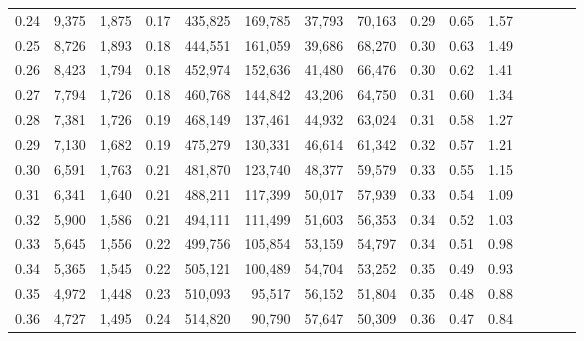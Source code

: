 \begin{tabular}{rrrcrrrrrrrrrrr}
0.24 &   9,375 &  1,875 &                                       0.17 &  435,825 &  169,785 &   37,793 &   70,163 &  0.29 &  0.65 &                         1.57 \\
0.25 &   8,726 &  1,893 &                                       0.18 &  444,551 &  161,059 &   39,686 &   68,270 &  0.30 &  0.63 &                         1.49 \\
0.26 &   8,423 &  1,794 &                                       0.18 &  452,974 &  152,636 &   41,480 &   66,476 &  0.30 &  0.62 &                         1.41 \\
0.27 &   7,794 &  1,726 &                                       0.18 &  460,768 &  144,842 &   43,206 &   64,750 &  0.31 &  0.60 &                         1.34 \\
0.28 &   7,381 &  1,726 &                                       0.19 &  468,149 &  137,461 &   44,932 &   63,024 &  0.31 &  0.58 &                         1.27 \\
0.29 &   7,130 &  1,682 &                                       0.19 &  475,279 &  130,331 &   46,614 &   61,342 &  0.32 &  0.57 &                         1.21 \\
0.30 &   6,591 &  1,763 &                                       0.21 &  481,870 &  123,740 &   48,377 &   59,579 &  0.33 &  0.55 &                         1.15 \\
0.31 &   6,341 &  1,640 &                                       0.21 &  488,211 &  117,399 &   50,017 &   57,939 &  0.33 &  0.54 &                         1.09 \\
0.32 &   5,900 &  1,586 &                                       0.21 &  494,111 &  111,499 &   51,603 &   56,353 &  0.34 &  0.52 &                         1.03 \\
0.33 &   5,645 &  1,556 &                                       0.22 &  499,756 &  105,854 &   53,159 &   54,797 &  0.34 &  0.51 &                         0.98 \\
0.34 &   5,365 &  1,545 &                                       0.22 &  505,121 &  100,489 &   54,704 &   53,252 &  0.35 &  0.49 &                         0.93 \\
0.35 &   4,972 &  1,448 &                                       0.23 &  510,093 &   95,517 &   56,152 &   51,804 &  0.35 &  0.48 &                         0.88 \\
0.36 &   4,727 &  1,495 &                                       0.24 &  514,820 &   90,790 &   57,647 &   50,309 &  0.36 &  0.47 &                         0.84 \\

\end{tabular}
